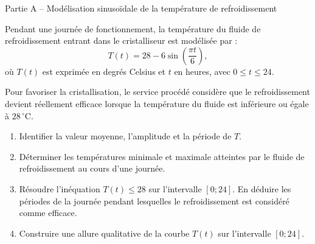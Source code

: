 \documentclass[10pt,a4paper]{article}
\begin{document}
	\begin{partbox}{Partie A -- Modélisation sinusoïdale de la température de refroidissement}
		
		Pendant une journée de fonctionnement, la température du fluide de refroidissement entrant dans le cristalliseur est modélisée par :
		\[
		T(t)=28-6\sin\left(\frac{\pi t}{6}\right),
		\]
		où $T(t)$ est exprimée en degrés Celsius et $t$ en heures, avec $0\leq t\leq 24$.
		
		\begin{databox}
			Pour favoriser la cristallisation, le service procédé considère que le refroidissement devient réellement efficace lorsque la température du fluide est inférieure ou égale à $28\,^\circ\mathrm{C}$.
		\end{databox}
		
		\begin{enumerate}
			\item Identifier la valeur moyenne, l'amplitude et la période de $T$. %
			
			\item Déterminer les températures minimale et maximale atteintes par le fluide de refroidissement au cours d'une journée.
			
			\item Résoudre l'inéquation $T(t)\leq 28$ sur l'intervalle $[0;24]$. En déduire les périodes de la journée pendant lesquelles le refroidissement est considéré comme efficace.
			
			\item Construire une allure qualitative de la courbe $T(t)$ sur l'intervalle $[0;24]$.
		\end{enumerate}
		
	\end{partbox}
	
\end{document}
